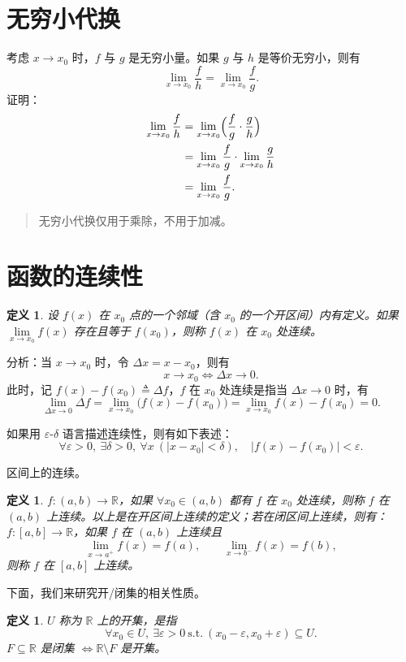 \documentclass[UTF8,11pt]{ctexart}
\theoremstyle{cnthm}
\newtheorem{defn}[thm]{定义}
\begin{document}
\section{无穷小代换}

考虑 $x\to x_0$ 时，$f$ 与 $g$ 是无穷小量。如果 $g$ 与 $h$ 是等价无穷小，则有
\[
\lim_{x\to x_0}\frac{f}{h}=\lim_{x\to x_0}\frac{f}{g}.
\]
证明：
\[
\begin{aligned}
\lim_{x\to x_0}\frac{f}{h}
&=\lim_{x\to x_0}\Bigl(\frac{f}{g}\cdot\frac{g}{h}\Bigr)\\
&=\lim_{x\to x_0}\frac{f}{g}\cdot\lim_{x\to x_0}\frac{g}{h}\\
&=\lim_{x\to x_0}\frac{f}{g}.
\end{aligned}
\]
\begin{quote}
无穷小代换仅用于乘除，不用于加减。
\end{quote}

\section{函数的连续性}

\begin{defn}
设 $f(x)$ 在 $x_0$ 点的一个邻域（含 $x_0$ 的一个开区间）内有定义。如果 $\lim\limits_{x\to x_0}f(x)$ 存在且等于 $f(x_0)$，则称 $f(x)$ 在 $x_0$ 处连续。
\end{defn}

分析：当 $x\to x_0$ 时，令 $\Delta x=x-x_0$，则有
\[
x\to x_0\iff \Delta x\to 0.
\]
此时，记 $f(x)-f(x_0)\triangleq\Delta f$，$f$ 在 $x_0$ 处连续是指当 $\Delta x\to 0$ 时，有
\[
\lim_{\Delta x\to 0}\Delta f
=\lim_{x\to x_0}\bigl(f(x)-f(x_0)\bigr)
=\lim_{x\to x_0}f(x)-f(x_0)=0.
\]

如果用 $\varepsilon$-$\delta$ 语言描述连续性，则有如下表述：
\[
\forall\varepsilon>0,\ \exists\delta>0,\ \forall x\ (|x-x_0|<\delta),\quad
|f(x)-f(x_0)|<\varepsilon.
\]

区间上的连续。

\begin{defn}
$f:(a,b)\to\mathbb{R}$，如果 $\forall x_0\in(a,b)$ 都有 $f$ 在 $x_0$ 处连续，则称 $f$ 在 $(a,b)$ 上连续。以上是在开区间上连续的定义；若在闭区间上连续，则有：$f:[a,b]\to\mathbb{R}$，如果 $f$ 在 $(a,b)$ 上连续且
\[
\lim_{x\to a^+}f(x)=f(a),\qquad
\lim_{x\to b^-}f(x)=f(b),
\]
则称 $f$ 在 $[a,b]$ 上连续。
\end{defn}

下面，我们来研究开/闭集的相关性质。

\begin{defn}
$U$ 称为 $\mathbb{R}$ 上的开集，是指
\[
\forall x_0\in U,\ \exists\varepsilon>0\ \text{s.t.}\
(x_0-\varepsilon,x_0+\varepsilon)\subseteq U.
\]
$F\subseteq\mathbb{R}$ 是闭集 $\iff\mathbb{R}\setminus F$ 是开集。
\end{defn}
\end{document}

